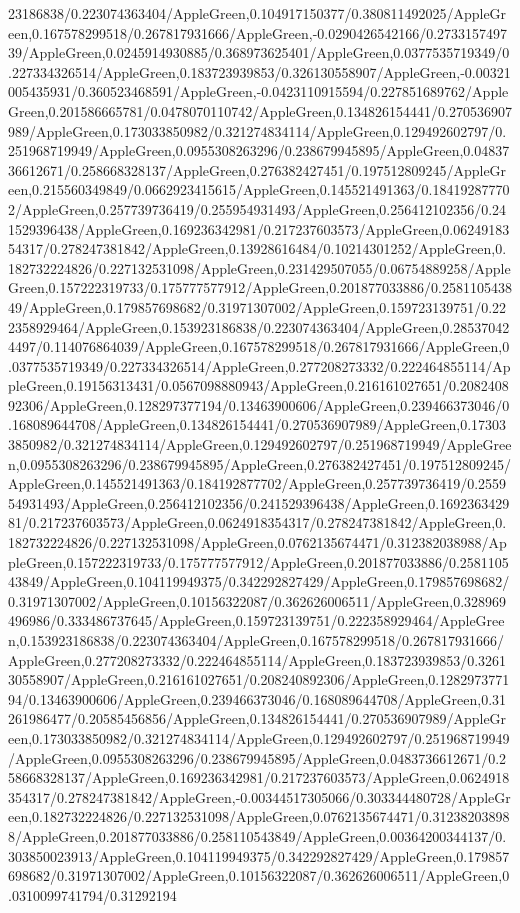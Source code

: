 {\begin{tikzternal}
{23186838/0.223074363404/AppleGreen,0.104917150377/0.380811492025/AppleGreen,0.167578299518/0.267817931666/AppleGreen,-0.0290426542166/0.273315749739/AppleGreen,0.0245914930885/0.368973625401/AppleGreen,0.0377535719349/0.227334326514/AppleGreen,0.183723939853/0.326130558907/AppleGreen,-0.00321005435931/0.360523468591/AppleGreen,-0.0423110915594/0.227851689762/AppleGreen,0.201586665781/0.0478070110742/AppleGreen,0.134826154441/0.270536907989/AppleGreen,0.173033850982/0.321274834114/AppleGreen,0.129492602797/0.251968719949/AppleGreen,0.0955308263296/0.238679945895/AppleGreen,0.0483736612671/0.258668328137/AppleGreen,0.276382427451/0.197512809245/AppleGreen,0.215560349849/0.0662923415615/AppleGreen,0.145521491363/0.184192877702/AppleGreen,0.257739736419/0.255954931493/AppleGreen,0.256412102356/0.241529396438/AppleGreen,0.169236342981/0.217237603573/AppleGreen,0.0624918354317/0.278247381842/AppleGreen,0.13928616484/0.10214301252/AppleGreen,0.182732224826/0.227132531098/AppleGreen,0.231429507055/0.06754889258/AppleGreen,0.157222319733/0.175777577912/AppleGreen,0.201877033886/0.258110543849/AppleGreen,0.179857698682/0.31971307002/AppleGreen,0.159723139751/0.222358929464/AppleGreen,0.153923186838/0.223074363404/AppleGreen,0.285370424497/0.114076864039/AppleGreen,0.167578299518/0.267817931666/AppleGreen,0.0377535719349/0.227334326514/AppleGreen,0.277208273332/0.222464855114/AppleGreen,0.19156313431/0.0567098880943/AppleGreen,0.216161027651/0.208240892306/AppleGreen,0.128297377194/0.13463900606/AppleGreen,0.239466373046/0.168089644708/AppleGreen,0.134826154441/0.270536907989/AppleGreen,0.173033850982/0.321274834114/AppleGreen,0.129492602797/0.251968719949/AppleGreen,0.0955308263296/0.238679945895/AppleGreen,0.276382427451/0.197512809245/AppleGreen,0.145521491363/0.184192877702/AppleGreen,0.257739736419/0.255954931493/AppleGreen,0.256412102356/0.241529396438/AppleGreen,0.169236342981/0.217237603573/AppleGreen,0.0624918354317/0.278247381842/AppleGreen,0.182732224826/0.227132531098/AppleGreen,0.0762135674471/0.312382038988/AppleGreen,0.157222319733/0.175777577912/AppleGreen,0.201877033886/0.258110543849/AppleGreen,0.104119949375/0.342292827429/AppleGreen,0.179857698682/0.31971307002/AppleGreen,0.10156322087/0.362626006511/AppleGreen,0.328969496986/0.333486737645/AppleGreen,0.159723139751/0.222358929464/AppleGreen,0.153923186838/0.223074363404/AppleGreen,0.167578299518/0.267817931666/AppleGreen,0.277208273332/0.222464855114/AppleGreen,0.183723939853/0.326130558907/AppleGreen,0.216161027651/0.208240892306/AppleGreen,0.128297377194/0.13463900606/AppleGreen,0.239466373046/0.168089644708/AppleGreen,0.31261986477/0.20585456856/AppleGreen,0.134826154441/0.270536907989/AppleGreen,0.173033850982/0.321274834114/AppleGreen,0.129492602797/0.251968719949/AppleGreen,0.0955308263296/0.238679945895/AppleGreen,0.0483736612671/0.258668328137/AppleGreen,0.169236342981/0.217237603573/AppleGreen,0.0624918354317/0.278247381842/AppleGreen,-0.00344517305066/0.303344480728/AppleGreen,0.182732224826/0.227132531098/AppleGreen,0.0762135674471/0.312382038988/AppleGreen,0.201877033886/0.258110543849/AppleGreen,0.00364200344137/0.303850023913/AppleGreen,0.104119949375/0.342292827429/AppleGreen,0.179857698682/0.31971307002/AppleGreen,0.10156322087/0.362626006511/AppleGreen,0.0310099741794/0.31292194}
\end{tikzternal}}
